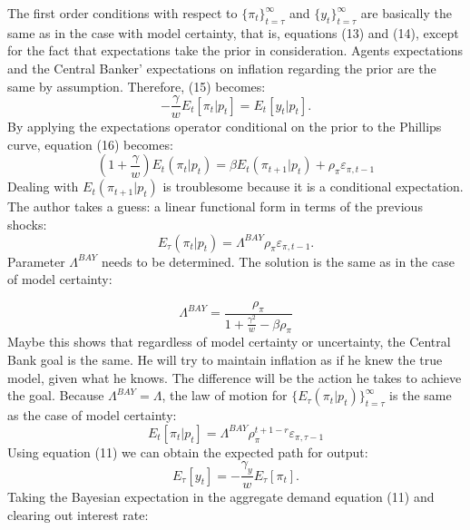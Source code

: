 \documentclass{beamer}
\begin{document}
\begin{frame}
The first order conditions with respect to $\{\pi_t\}^{\infty}_{t=\tau}$ and $\{y_t\}^{\infty}_{t=\tau}$
are basically the same as in the case with model certainty, that is, equations (13) and
(14), except for the fact that expectations take the prior in consideration.
Agents expectations and the Central Banker' expectations on inflation regarding
the prior are the same by assumption. Therefore, (15) becomes:
\begin{equation}
-\frac{\gamma}{w} E_t [\pi_t|p_t] = E_t [y_t|p_t].
\end{equation}
By applying the expectations operator conditional on the prior to the Phillips
curve, equation (16) becomes:
\begin{equation}
\left (1 + \frac{\gamma}{w} \right ) E_t (\pi_t | p_t) = \beta E_t (\pi_{t+1} |p_t) + \rho_\pi \varepsilon_{\pi,t-1}
\end{equation}
Dealing with $E_t (\pi_{t+1} |p_t)$ is troublesome because it is a conditional
expectation. The author takes a guess: a linear functional form in terms of the
previous shocks:
\begin{equation}
E_\tau (\pi_t|p_t) = \Lambda^{BAY} \rho_\pi \varepsilon_{\pi,t-1}.
\end{equation}
Parameter $\Lambda^{BAY}$ needs to be determined. The solution is the same as in
the case of model certainty:
\end{frame}

\begin{frame}
\begin{equation}
\Lambda^{BAY} = \frac{\rho_\pi}{1+\frac{\gamma^2}{w} - \beta \rho_\pi}
\end{equation}
\newline
\newline
Maybe this shows that regardless of model certainty or uncertainty, the Central
Bank goal is the same.  He will try to maintain inflation as if he knew the true
model, given what he knows. The difference will be the action he takes to
achieve the goal.
Because $\Lambda^{BAY} = \Lambda$, the law of motion for $\{E_{\tau}(\pi_t | p_t)\}^{\infty}_{t=\tau}$
is the same as the case of model certainty:
\begin{equation}
E_t[\pi_t|p_t] = \Lambda^{BAY} \rho_\pi^{t+1-r} \varepsilon_{\pi,\tau-1}
\end{equation}
Using equation (11) we can obtain the expected path for output:
\begin{equation}
E_\tau[y_t] = -\frac{\gamma_y}{w} E_\tau [\pi_t].
\end{equation}
Taking the Bayesian expectation in the aggregate demand equation (11) and
clearing out interest rate:
\end{frame}
\end{document}
